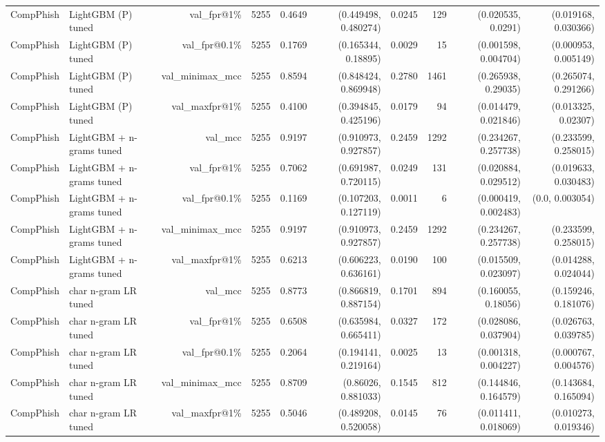 \begin{table}[t]
\begin{tabular}{llrrrrrrrr}
CompPhish & LightGBM (P) tuned & val\_fpr@1\% & 5255 & 0.4649 & (0.449498, 0.480274) & 0.0245 & 129 & (0.020535, 0.0291) & (0.019168, 0.030366) \\
CompPhish & LightGBM (P) tuned & val\_fpr@0.1\% & 5255 & 0.1769 & (0.165344, 0.18895) & 0.0029 & 15 & (0.001598, 0.004704) & (0.000953, 0.005149) \\
CompPhish & LightGBM (P) tuned & val\_minimax\_mcc & 5255 & 0.8594 & (0.848424, 0.869948) & 0.2780 & 1461 & (0.265938, 0.29035) & (0.265074, 0.291266) \\
CompPhish & LightGBM (P) tuned & val\_maxfpr@1\% & 5255 & 0.4100 & (0.394845, 0.425196) & 0.0179 & 94 & (0.014479, 0.021846) & (0.013325, 0.02307) \\
CompPhish & LightGBM + n-grams tuned & val\_mcc & 5255 & 0.9197 & (0.910973, 0.927857) & 0.2459 & 1292 & (0.234267, 0.257738) & (0.233599, 0.258015) \\
CompPhish & LightGBM + n-grams tuned & val\_fpr@1\% & 5255 & 0.7062 & (0.691987, 0.720115) & 0.0249 & 131 & (0.020884, 0.029512) & (0.019633, 0.030483) \\
CompPhish & LightGBM + n-grams tuned & val\_fpr@0.1\% & 5255 & 0.1169 & (0.107203, 0.127119) & 0.0011 & 6 & (0.000419, 0.002483) & (0.0, 0.003054) \\
CompPhish & LightGBM + n-grams tuned & val\_minimax\_mcc & 5255 & 0.9197 & (0.910973, 0.927857) & 0.2459 & 1292 & (0.234267, 0.257738) & (0.233599, 0.258015) \\
CompPhish & LightGBM + n-grams tuned & val\_maxfpr@1\% & 5255 & 0.6213 & (0.606223, 0.636161) & 0.0190 & 100 & (0.015509, 0.023097) & (0.014288, 0.024044) \\
CompPhish & char n-gram LR tuned & val\_mcc & 5255 & 0.8773 & (0.866819, 0.887154) & 0.1701 & 894 & (0.160055, 0.18056) & (0.159246, 0.181076) \\
CompPhish & char n-gram LR tuned & val\_fpr@1\% & 5255 & 0.6508 & (0.635984, 0.665411) & 0.0327 & 172 & (0.028086, 0.037904) & (0.026763, 0.039785) \\
CompPhish & char n-gram LR tuned & val\_fpr@0.1\% & 5255 & 0.2064 & (0.194141, 0.219164) & 0.0025 & 13 & (0.001318, 0.004227) & (0.000767, 0.004576) \\
CompPhish & char n-gram LR tuned & val\_minimax\_mcc & 5255 & 0.8709 & (0.86026, 0.881033) & 0.1545 & 812 & (0.144846, 0.164579) & (0.143684, 0.165094) \\
CompPhish & char n-gram LR tuned & val\_maxfpr@1\% & 5255 & 0.5046 & (0.489208, 0.520058) & 0.0145 & 76 & (0.011411, 0.018069) & (0.010273, 0.019346) \\

\end{tabular}
\end{table}

